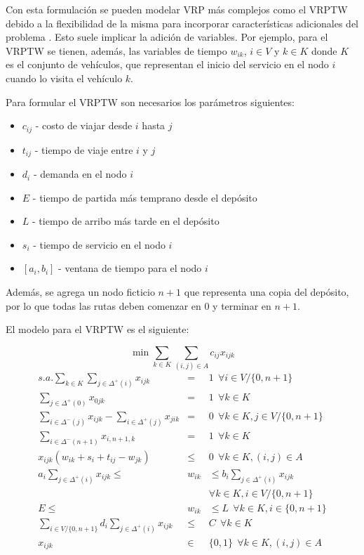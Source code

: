 Con esta formulación se pueden modelar VRP más complejos como el VRPTW debido a la flexibilidad de la misma para incorporar características adicionales del problema \cite{toth@vrp}. Esto suele implicar la adición de variables. Por ejemplo, para el VRPTW se tienen, además, las variables de tiempo $w_{ik}$, $i \in V$ y $k \in K$ donde $K$ es el conjunto de vehículos, que representan el inicio del servicio en el nodo $i$ cuando lo visita el vehículo $k$.

Para formular el VRPTW son necesarios los parámetros siguientes:

\begin{itemize}
	\item $c_{ij}$ - costo de viajar desde $i$ hasta $j$
	\item $t_{ij}$ - tiempo de viaje entre $i$ y $j$
	\item $d_i$ - demanda en el nodo $i$
	\item $E$ - tiempo de partida más temprano desde el depósito
	\item $L$ - tiempo de arribo más tarde en el depósito
	\item $s_i$ - tiempo de servicio en el nodo $i$
	\item $[a_i, b_i]$ - ventana de tiempo para el nodo $i$
\end{itemize}

Además, se agrega un nodo ficticio $n + 1$ que representa una copia del depósito, por lo que todas las rutas deben comenzar en 0 y terminar en $n + 1$.

El modelo para el VRPTW es el siguiente:

$$
\min \displaystyle{\sum_{k \in K} \sum_{(i, j) \in A} c_{ij} x_{ijk}}
$$
\begin{eqnarray}
s.a. \displaystyle{\sum_{k \in K} \sum_{j \in \Delta^+(i)} x_{ijk}} & = & 1 \ \ \forall i \in V / \{0, n + 1\}\\
\displaystyle{\sum_{j \in \Delta^+(0)} x_{0jk}} & = & 1 \ \ \forall k \in K\\
\displaystyle{\sum_{i \in \Delta^-(j)} x_{ijk} - \sum_{i \in \Delta^+(j)} x_{jik}} & = & 0 \ \ \forall k \in K, j \in V / \{0, n + 1\}\\
\displaystyle{\sum_{i \in \Delta^-(n + 1)} x_{i, n + 1, k}} & = & 1 \ \ \forall k \in K\\
x_{ijk}(w_{ik} + s_i + t_{ij} - w_{jk}) & \leq & 0 \ \ \forall k \in K, (i, j) \in A\\
a_i \displaystyle{\sum_{j \in \Delta^+(i)} x_{ijk}} \leq & w_{ik} & \leq b_i \displaystyle{\sum_{j \in \Delta^+(i)} x_{ijk}}\\ \nonumber & & \forall k \in K, i \in V / \{0, n + 1\}\\
E \leq & w_{ik} & \leq L \ \ \forall k \in K, i \in \{0, n + 1\}\\
\displaystyle{\sum_{i \in V / \{0, n + 1\}} d_i \sum_{j \in \Delta^+(i)} x_{ijk}} & \leq & C \ \ \forall k \in K\\
x_{ijk} & \in & \{0, 1\} \ \ \forall k \in K, (i, j) \in A
\end{eqnarray}

